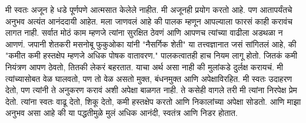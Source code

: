 मी स्वतः अजून हे धडे पूर्णपणे आत्मसात केलेले नाहीत. मी अजूनही प्रयोग करतो आहे. पण आतापर्यंतचे अनुभव अत्यंत आनंददायी आहेत. मला जाणवलं आहे की पालक म्हणून आपल्याला फारसं काही करावंच लागत नाही. सर्वात मोठं काम म्हणजे त्यांना सुरक्षित ठेवणं आणि आपणच त्यांच्या वाढीला अडथळा न आणणं.
जपानी शेतकरी मसनोबू फुकुओका यांनी "नैसर्गिक शेती" या तत्त्वज्ञानात जसं सांगितलं आहे, की "कमीत कमी हस्तक्षेप म्हणजे अधिक पोषक वातावरण." पालकत्वातही हाच नियम लागू होतो. जितकं कमी नियंत्रण आपण ठेवतो, तितकी लेकरं बहरतात.
याचा अर्थ असा नाही की मुलांकडे दुर्लक्ष करायचं. मी त्यांच्यासोबत वेळ घालवतो, पण तो वेळ असतो मुक्त, बंधनमुक्त आणि अपेक्षाविरहित. मी स्वतः उदाहरण देतो, पण त्यांनी ते अनुकरण करावं अशी अपेक्षा बाळगत नाही. ते कसेही वागले तरी मी त्यांना निरपेक्ष प्रेम देतो. त्यांना स्वतः वाढू देतो, शिकू देतो, कमी हस्तक्षेप करतो आणि निकालांच्या अपेक्षा सोडतो. आणि माझा अनुभव असा आहे की या पद्धतीमुळे मुलं अधिक आनंदी, स्वतंत्र आणि निडर होतात.
